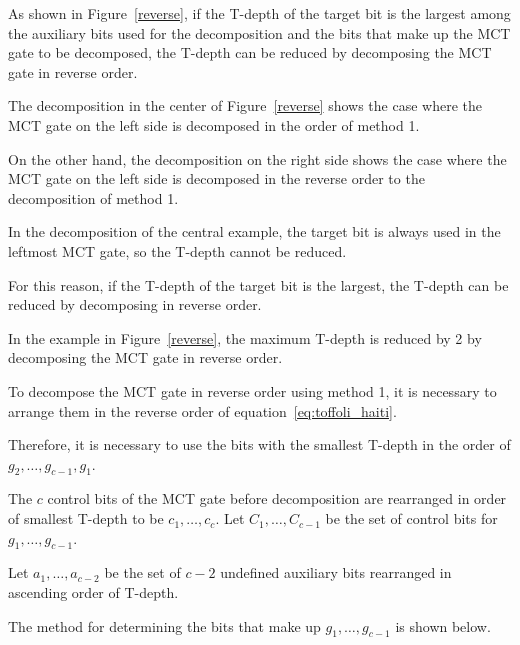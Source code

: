 \par
As shown in Figure~\ref{reverse},
if the T-depth of the target bit is the largest among the auxiliary bits used for the decomposition and the bits that make up the MCT gate to be decomposed,
the T-depth can be reduced by decomposing the MCT gate in reverse order.

The decomposition in the center of Figure~\ref{reverse}
shows the case where the MCT gate on the left side is decomposed in the order of method 1.

On the other hand, the decomposition on the right side shows the case where the MCT gate on the left side is decomposed in the reverse order to the decomposition of method 1.

In the decomposition of the central example, the target bit is always used in the leftmost MCT gate, so the T-depth cannot be reduced.

For this reason, if the T-depth of the target bit is the largest, the T-depth can be reduced by decomposing in reverse order.

In the example in Figure~\ref{reverse}, the maximum T-depth is reduced by 2 by decomposing the MCT gate in reverse order.

\par
To decompose the MCT gate in reverse order using method 1, it is necessary to arrange them in the reverse order of equation~\ref{eq:toffoli_haiti}.

Therefore, it is necessary to use the bits with the smallest T-depth in the order of $g_{2},\dots,g_{c-1},g_{1}$.

The $c$ control bits of the MCT gate before decomposition are rearranged in order of smallest T-depth to be $c_{1},\dots,c_{c}$.
Let $C_{1},\dots,C_{c-1}$ be the set of control bits for $g_{1},\dots,g_{c-1}$.

Let $a_{1},\dots,a_{c-2}$ be the set of $c-2$ undefined auxiliary bits rearranged in ascending order of T-depth.

The method for determining the bits that make up $g_{1},\dots,g_{c-1}$ is shown below.

